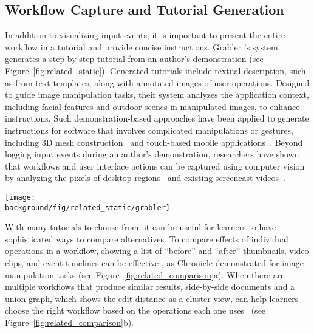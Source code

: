 
\subsection{Workflow Capture and Tutorial Generation}
In addition to visualizing input events, it is important to present the entire workflow in a tutorial and provide concise instructions.
%
Grabler \ea{}'s system~\cite{Grabler:2009jj} generates a step-by-step tutorial from an author's demonstration (see Figure~\ref{fig:related_static}). Generated tutorials include textual description, such as  from text templates, along with annotated images of user operations. Designed to guide image manipulation tasks, their system analyzes the application context, including facial features and outdoor scenes in manipulated images, to enhance instructions.
%
Such demonstration-based approaches have been applied to generate instructions for software that involves complicated manipulations or gestures, including 3D mesh construction~\cite{Denning:2011fy} and touch-based mobile applications~\cite{Wang:2014:EAC:2556288.2557407}.
%
Beyond logging input events during an author's demonstration, researchers have shown that workflows and user interface actions can be captured using computer vision by analyzing the pixels of desktop regions~\cite{Yeh:2009dh,Chang:2011vd} and existing screencast videos~\cite{Banovic:2012kd}.

\begin{figure*}[t!]
  \centering
  \texttt{[image: \\background/fig/related\_static/grabler]}
  \caption{A static tutorial automatically generated by Grabler \ea{}'s system~\cite{Grabler:2009jj}.}
  \label{fig:related_static}
\end{figure*}

With many tutorials to choose from, it can be useful for learners to have sophisticated ways to compare alternatives. To compare effects of individual operations in a workflow, showing a list of ``before'' and ``after'' thumbnails, video clips, and event timelines can be effective \cite{Grossman:2010jz}, as Chronicle demonstrated for image manipulation tasks (see Figure~\ref{fig:related_comparison}a).
%
When there are multiple workflows that produce similar results, side-by-side documents and a union graph, which shows the edit distance as a cluster view, can help learners choose the right workflow based on the operations each one uses~\cite{Kong:2012:DTR:2207676.2208549} (see Figure~\ref{fig:related_comparison}b).

